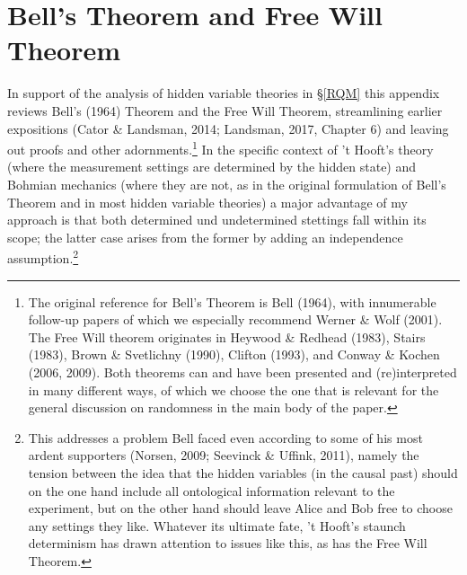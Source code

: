 \documentclass[11pt,a4paper]{article}
\numberwithin{equation}{section}
\begin{document}
\section{Bell's Theorem and  Free Will Theorem}\label{FWT}
In support of the analysis of hidden variable theories in \S\ref{RQM} this appendix  reviews Bell's (1964) Theorem and the Free Will Theorem, streamlining earlier expositions  (Cator \&  Landsman, 2014;  Landsman, 2017, Chapter 6) and leaving out proofs and other adornments.\footnote{The original reference for Bell's Theorem is Bell (1964), with innumerable follow-up papers of which we especially recommend  Werner \& Wolf (2001). The Free Will theorem originates in  Heywood \& Redhead (1983), Stairs (1983),
 Brown \& Svetlichny (1990),  Clifton (1993), and Conway \& Kochen (2006, 2009). Both theorems can and have been presented and (re)interpreted in many different ways, of which we choose the one that is relevant for the general discussion on randomness in the main body of the paper. } 
 In the specific context of 't Hooft's theory (where the measurement settings are determined by the hidden state) and Bohmian mechanics (where they are not, as in the original formulation of Bell's Theorem and in most hidden variable theories) a major advantage of my approach is that both determined und undetermined stettings fall within its scope; the latter case arises from the former by adding an independence assumption.\footnote{
  This addresses a problem Bell faced even according to some of his most ardent supporters
(Norsen, 2009; Seevinck \& Uffink, 2011), namely the tension between the idea that the hidden variables (in the  causal past) should on the one hand include all ontological information relevant to the experiment, but on the other hand should leave Alice and Bob free to choose any settings they like. Whatever its ultimate fate, 't Hooft's staunch determinism has drawn attention to issues like this, as has the Free Will Theorem.}
\end{document}
